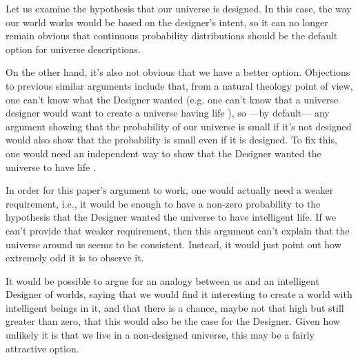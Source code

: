 \documentclass[a4paper
,draft
]{article}
\begin{document}
Let us examine the hypothesis that our universe is designed.
In this case, the way our world works would be based
on the designer's intent,
so it can no longer remain obvious that continuous probability distributions
should be the default option for universe descriptions.

On the other hand, it's also not obvious that we have a better option.
Objections to previous similar arguments include that,
from a natural theology point of view, one can't
know what the Designer wanted
(e.g. one can't know that a universe designer would want to create
a universe having life \parencites{Sober2009}{Narveson2003}), so ---by default---
any argument showing that the probability of our universe is small
if it's not designed would also show that the probability is small
even if it is designed.
To fix this, one would need an independent way to show that the Designer
wanted the universe to have life \parencite{Sober2003}.

In order for this paper's argument to work, one would actually need a weaker
requirement, i.e., it would be enough to have a non-zero probability
to the hypothesis that the Designer wanted the universe to have intelligent
life. If we can't provide that weaker requirement, then this argument can't explain
that the universe around us seems to be consistent.
Instead, it would just point out how extremely odd it is to observe it.

It would be possible to argue for an analogy between us and
an intelligent Designer of worlds, saying that we would find it interesting
to create a world with intelligent beings in it, and that there is a chance,
maybe not that high but still greater than zero, that this would also be
the case for the Designer.
Given how unlikely it is that we live in a non-designed universe, this may be
a fairly attractive option.
\end{document}
